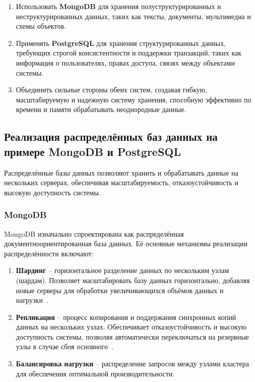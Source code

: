 \begin{enumerate}[leftmargin=1.6\parindent]
    \item Использовать \textbf{MongoDB} для хранения полуструктурированных и неструктурированных данных, таких как тексты, документы, мультимедиа и схемы объектов.
    \item Применять \textbf{PostgreSQL} для хранения структурированных данных, требующих строгой консистентности и поддержки транзакций, таких как информация о пользователях, правах доступа, связях между объектами системы.
    \item Объединить сильные стороны обеих систем, создавая гибкую, масштабируемую и надежную систему хранения, способную эффективно по времени и памяти обрабатывать неоднородные данные.
\end{enumerate}

\subsection{Реализация распределённых баз данных на примере MongoDB и PostgreSQL}

Распределённые базы данных позволяют хранить и обрабатывать данные на нескольких серверах, обеспечивая масштабируемость, отказоустойчивость и высокую доступность системы.

\subsubsection{MongoDB}

MongoDB изначально спроектирована как распределённая документноориентированная база данных. 
Её основные механизмы реализации распределённости включают:

\begin{enumerate}[leftmargin=1.6\parindent]
    \item \textbf{Шардинг} -- горизонтальное разделение данных по нескольким узлам (шардам). Позволяет масштабировать базу данных горизонтально, добавляя новые серверы для обработки увеличивающихся объёмов данных и нагрузки~\cite{shard-rep}.
    \item \textbf{Репликация} -- процесс копирования и поддержания синхронных копий данных на нескольких узлах. Обеспечивает отказоустойчивость и высокую доступность системы, позволяя автоматически переключаться на резервные узлы в случае сбоя основного~\cite{shard-rep}.
    \item \textbf{Балансировка нагрузки} -- распределение запросов между узлами кластера для обеспечения оптимальной производительности.
\end{enumerate}


